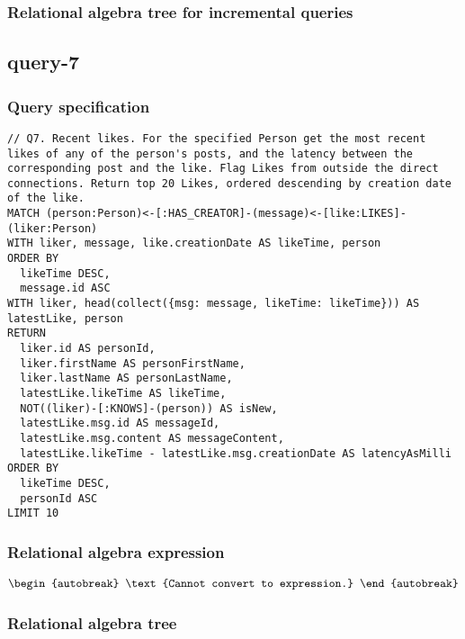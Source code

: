
\subsubsection*{Relational algebra tree for incremental queries}

\subsection{query-7}

\subsubsection*{Query specification}

\begin{lstlisting}
// Q7. Recent likes. For the specified Person get the most recent likes of any of the person's posts, and the latency between the corresponding post and the like. Flag Likes from outside the direct connections. Return top 20 Likes, ordered descending by creation date of the like.
MATCH (person:Person)<-[:HAS_CREATOR]-(message)<-[like:LIKES]-(liker:Person)
WITH liker, message, like.creationDate AS likeTime, person
ORDER BY
  likeTime DESC,
  message.id ASC
WITH liker, head(collect({msg: message, likeTime: likeTime})) AS latestLike, person
RETURN
  liker.id AS personId,
  liker.firstName AS personFirstName,
  liker.lastName AS personLastName,
  latestLike.likeTime AS likeTime,
  NOT((liker)-[:KNOWS]-(person)) AS isNew,
  latestLike.msg.id AS messageId,
  latestLike.msg.content AS messageContent,
  latestLike.likeTime - latestLike.msg.creationDate AS latencyAsMilli
ORDER BY
  likeTime DESC,
  personId ASC
LIMIT 10
\end{lstlisting}

\subsubsection*{Relational algebra expression}

\begin{align*}
\begin{autobreak}
\text{Cannot convert to expression.}
\end{autobreak}
\end{align*}

\subsubsection*{Relational algebra tree}

